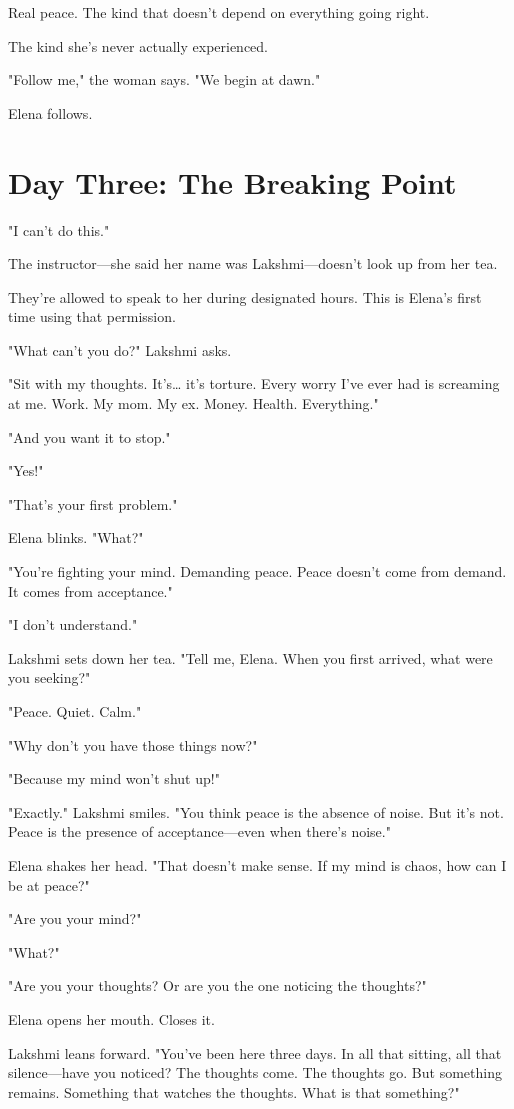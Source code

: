 \documentclass[11pt,twoside]{book}
\begin{document}
Real peace. The kind that doesn't depend on everything going right.

The kind she's never actually experienced.

"Follow me," the woman says. "We begin at dawn."

Elena follows.

\section*{Day Three: The Breaking Point}

"I can't do this."

The instructor—she said her name was Lakshmi—doesn't look up from her tea.

They're allowed to speak to her during designated hours. This is Elena's first time using that permission.

"What can't you do?" Lakshmi asks.

"Sit with my thoughts. It's\ldots{} it's torture. Every worry I've ever had is screaming at me. Work. My mom. My ex. Money. Health. Everything."

"And you want it to stop."

"Yes!"

"That's your first problem."

Elena blinks. "What?"

"You're fighting your mind. Demanding peace. Peace doesn't come from demand. It comes from acceptance."

"I don't understand."

Lakshmi sets down her tea. "Tell me, Elena. When you first arrived, what were you seeking?"

"Peace. Quiet. Calm."

"Why don't you have those things now?"

"Because my mind won't shut up!"

"Exactly." Lakshmi smiles. "You think peace is the absence of noise. But it's not. Peace is the presence of acceptance—even when there's noise."

Elena shakes her head. "That doesn't make sense. If my mind is chaos, how can I be at peace?"

"Are you your mind?"

"What?"

"Are you your thoughts? Or are you the one noticing the thoughts?"

Elena opens her mouth. Closes it.

Lakshmi leans forward. "You've been here three days. In all that sitting, all that silence—have you noticed? The thoughts come. The thoughts go. But something remains. Something that watches the thoughts. What is that something?"
\end{document}

